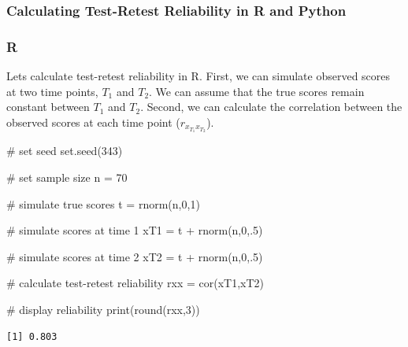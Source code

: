 \documentclass[
  letterpaper,
  DIV=11,
  numbers=noendperiod]{scrreprt}
\newenvironment{Shaded}{\begin{snugshade}}{\end{snugshade}}
\newcommand{\CommentTok}[1]{\textcolor[rgb]{0.37,0.37,0.37}{#1}}
\newcommand{\DecValTok}[1]{\textcolor[rgb]{0.68,0.00,0.00}{#1}}
\newcommand{\FunctionTok}[1]{\textcolor[rgb]{0.28,0.35,0.67}{#1}}
\newcommand{\NormalTok}[1]{\textcolor[rgb]{0.00,0.23,0.31}{#1}}
\newcommand{\OtherTok}[1]{\textcolor[rgb]{0.00,0.23,0.31}{#1}}
\newcommand{\SpecialCharTok}[1]{\textcolor[rgb]{0.37,0.37,0.37}{#1}}
\begin{document}
\hypertarget{calculating-test-retest-reliability-in-r-and-python}{%
\subsubsection*{Calculating Test-Retest Reliability in R and
Python}\label{calculating-test-retest-reliability-in-r-and-python}}

\subsubsection{R}

Lets calculate test-retest reliability in R. First, we can simulate
observed scores at two time points, \(T_1\) and \(T_2\). We can assume
that the true scores remain constant between \(T_1\) and \(T_2\).
Second, we can calculate the correlation between the observed scores at
each time point (\(r_{x_{T_1}x_{T_2}}\)).

\begin{Shaded}
\begin{Highlighting}[]
\CommentTok{\# set seed}
\FunctionTok{set.seed}\NormalTok{(}\DecValTok{343}\NormalTok{)}

\CommentTok{\# set sample size}
\NormalTok{n }\OtherTok{=} \DecValTok{70}

\CommentTok{\# simulate true scores}
\NormalTok{t }\OtherTok{=} \FunctionTok{rnorm}\NormalTok{(n,}\DecValTok{0}\NormalTok{,}\DecValTok{1}\NormalTok{)}

\CommentTok{\# simulate scores at time 1}
\NormalTok{xT1 }\OtherTok{=}\NormalTok{ t }\SpecialCharTok{+} \FunctionTok{rnorm}\NormalTok{(n,}\DecValTok{0}\NormalTok{,.}\DecValTok{5}\NormalTok{)}

\CommentTok{\# simulate scores at time 2}
\NormalTok{xT2 }\OtherTok{=}\NormalTok{ t }\SpecialCharTok{+} \FunctionTok{rnorm}\NormalTok{(n,}\DecValTok{0}\NormalTok{,.}\DecValTok{5}\NormalTok{)}

\CommentTok{\# calculate test{-}retest reliability}
\NormalTok{rxx }\OtherTok{=} \FunctionTok{cor}\NormalTok{(xT1,xT2)}

\CommentTok{\# display reliability}
\FunctionTok{print}\NormalTok{(}\FunctionTok{round}\NormalTok{(rxx,}\DecValTok{3}\NormalTok{))}
\end{Highlighting}
\end{Shaded}

\begin{verbatim}
[1] 0.803
\end{verbatim}
\end{document}

